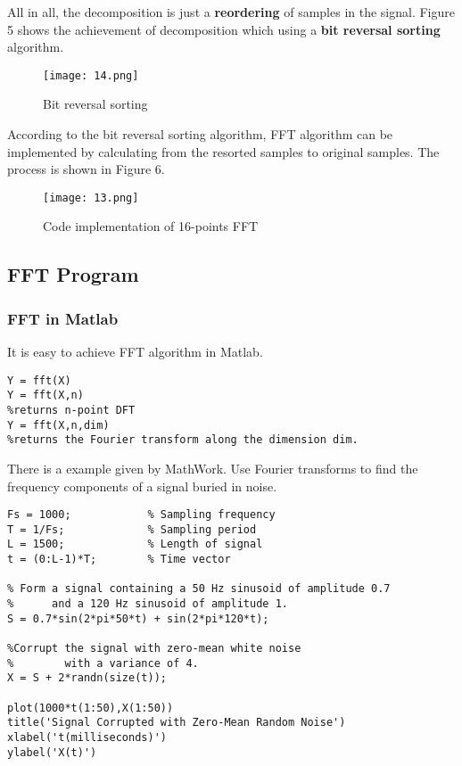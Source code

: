 \documentclass[12pt,a4paper]{article}
\begin{document}
All in all, the decomposition is just a \textbf{reordering} of samples in the signal. Figure 5 shows the achievement of decomposition which using a \textbf{bit reversal sorting} algorithm. 
\begin{figure}[hbtp]
\centering
\texttt{[image: 14.png]}
\caption{Bit reversal sorting}
\end{figure}
\newpage


According to the bit reversal sorting algorithm, FFT algorithm can be implemented by calculating from the resorted samples to original samples. The process is shown in Figure 6.
\begin{figure}[hbtp]
\centering
\texttt{[image: 13.png]}
\caption{Code implementation of 16-points FFT}
\end{figure}

\newpage
\subsection{FFT Program}
\subsubsection{FFT in Matlab}


It is easy to achieve FFT algorithm in Matlab.
\lstset{language=Matlab}
\begin{lstlisting}
Y = fft(X)
Y = fft(X,n)      
%returns n-point DFT  
Y = fft(X,n,dim)  
%returns the Fourier transform along the dimension dim.
\end{lstlisting}

There is a example given by MathWork. Use Fourier transforms to find the frequency components of a signal buried in noise.
\lstset{language=Matlab}
\begin{lstlisting}
Fs = 1000;            % Sampling frequency                    
T = 1/Fs;             % Sampling period       
L = 1500;             % Length of signal
t = (0:L-1)*T;        % Time vector

% Form a signal containing a 50 Hz sinusoid of amplitude 0.7 
%      and a 120 Hz sinusoid of amplitude 1.
S = 0.7*sin(2*pi*50*t) + sin(2*pi*120*t);

%Corrupt the signal with zero-mean white noise 
%        with a variance of 4.
X = S + 2*randn(size(t));

plot(1000*t(1:50),X(1:50))
title('Signal Corrupted with Zero-Mean Random Noise')
xlabel('t(milliseconds)')
ylabel('X(t)')
\end{lstlisting}
\end{document}
